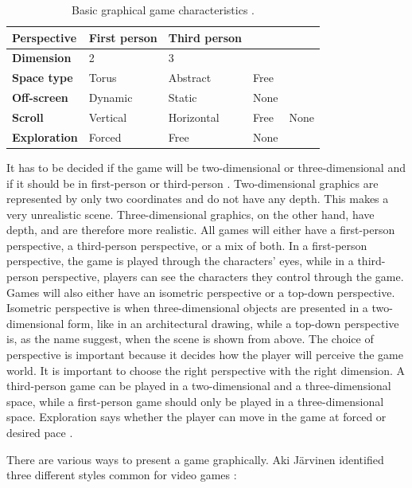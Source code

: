 \begin{table}
\centering
    \begin{tabular}{|l|l|l|l|l|}
        \hline
       \textbf{Perspective} & First person & Third person & &  \\ \hline
       \textbf{Dimension} & 2 & 3 & & \\ \hline
       \textbf{Space type} & Torus & Abstract & Free & \\ \hline
	   \textbf{Off-screen} & Dynamic & Static & None & \\ \hline
	   \textbf{Scroll} & Vertical & Horizontal & Free & None \\ \hline
	   \textbf{Exploration} & Forced & Free & None & \\
        \hline
    \end{tabular}
    \caption[Graphical Characteristics]{Basic graphical game characteristics \cite{understandingvg}.}
    \label{tab:graphic}
\end{table} 

It has to be decided if the game will be two-dimensional or three-dimensional and if it should be in first-person or third-person \cite{understandingvg}. Two-dimensional graphics are represented by only two coordinates and do not have any depth. This makes a very unrealistic scene. Three-dimensional graphics, on the other hand, have depth, and are therefore more realistic. All games will either have a first-person perspective, a third-person perspective, or a mix of both. In a first-person perspective, the game is played through the characters' eyes, while in a third-person perspective, players can see the characters they control through the game. Games will also either have an isometric perspective or a top-down perspective. Isometric perspective is when three-dimensional objects are presented in a two-dimensional form, like in an architectural drawing, while a top-down perspective is, as the name suggest, when the scene is shown from above. The choice of perspective is important because it decides how the player will perceive the game world. It is important to choose the right perspective with the right dimension. A third-person game can be played in a two-dimensional and a three-dimensional space, while a first-person game should only be played in a three-dimensional space. Exploration says whether the player can move in the game at forced or desired pace \cite{understandingvg}.

There are various ways to present a game graphically. Aki Järvinen identified three different styles common for video games \cite{understandingvg}: 

